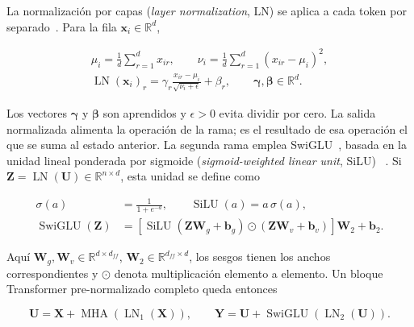 La normalización por capas (\emph{layer normalization}, LN) se aplica a cada
token por separado~\cite{ba_layernorm_2016}. Para la fila
\(\mathbf x_i\in\mathbb R^d\),

\begin{equation}
    \begin{gathered}
    \mu_i=\frac{1}{d}\sum_{r=1}^{d}x_{ir},\qquad
    \nu_i=\frac{1}{d}\sum_{r=1}^{d}(x_{ir}-\mu_i)^2,\\
    \operatorname{LN}(\mathbf x_i)_r
      =\gamma_r\frac{x_{ir}-\mu_i}{\sqrt{\nu_i+\epsilon}}+\beta_r,
      \qquad \boldsymbol\gamma,\boldsymbol\beta\in\mathbb R^d.
    \end{gathered}
    \label{eq:definicion-layernorm}
\end{equation}

Los vectores \(\boldsymbol\gamma\) y \(\boldsymbol\beta\) son aprendidos y
\(\epsilon>0\) evita dividir por cero. La salida normalizada alimenta la
operación de la rama; es el resultado de esa operación el que se suma al estado
anterior. La segunda rama emplea SwiGLU~\cite{shazeer_glu_2020}, basada en la unidad lineal ponderada por
sigmoide (\emph{sigmoid-weighted linear unit}, SiLU)
~\cite{elfwing_silu_2018}. Si
\(\mathbf Z=\operatorname{LN}(\mathbf U)\in\mathbb R^{n\times d}\), esta
unidad se define como

\begin{equation}
    \begin{aligned}
    \sigma(a)&=\frac{1}{1+e^{-a}},\qquad
    \operatorname{SiLU}(a)=a\,\sigma(a),\\
    \operatorname{SwiGLU}(\mathbf Z)
      &=\left[\operatorname{SiLU}(\mathbf Z\mathbf W_g+\mathbf b_g)
      \odot(\mathbf Z\mathbf W_v+\mathbf b_v)\right]\mathbf W_2+\mathbf b_2.
    \end{aligned}
    \label{eq:definicion-swiglu}
\end{equation}

Aquí \(\mathbf W_g,\mathbf W_v\in\mathbb R^{d\times d_{ff}}\),
\(\mathbf W_2\in\mathbb R^{d_{ff}\times d}\), los sesgos tienen los anchos
correspondientes y \(\odot\) denota multiplicación elemento a elemento. Un
bloque Transformer pre-normalizado completo queda entonces

\begin{equation}
    \mathbf U=\mathbf X+\operatorname{MHA}(\operatorname{LN}_1(\mathbf X)),
    \qquad
    \mathbf Y=\mathbf U+\operatorname{SwiGLU}(\operatorname{LN}_2(\mathbf U)).
    \label{eq:bloque-transformer-prenorm}
\end{equation}

